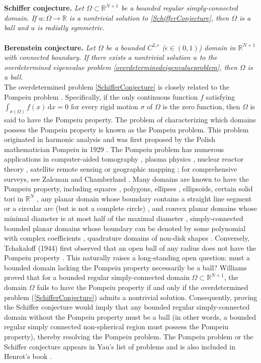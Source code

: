 \documentclass[12pt]{article}
\numberwithin{equation}{section}
\numberwithin{equation}{section}
\begin{document}
\\ \\
\textbf{Schiffer conjecture.} \emph{Let $\Omega\subset \mathbb{R}^{N+1}$ be a bounded regular simply-connected domain. If $u: \Omega \rightarrow \mathbb{R}$
is a nontrivial solution to \eqref{SchifferConjecture},
then $\Omega$ is a ball and $u$ is radially symmetric.}\\
\\
\textbf{Berenstein conjecture.}
\emph{Let $\Omega$ be a bounded $C^{2,\epsilon}$ ($\epsilon\in(0,1)$) domain in $\mathbb{R}^{N+1}$ with connected boundary. If there exists a nontrivial
solution $u$ to the overdetermined eigenvalue problem \eqref{overdeterminedeigenvalueproblem}, then $\Omega$ is a ball.}\\

The overdetermined problem \eqref{SchifferConjecture} is closely related to the Pompeiu problem \cite{Pompeiu}. Specifically, if the only continuous function $f$ satisfying $\int_{\sigma(\Omega)}f(x)\,\text{d}x=0$ for every rigid motion $\sigma$ of $\Omega$ is the zero function, then $\Omega$ is said to have the Pompeiu property. The problem of characterizing which domains possess the Pompeiu property is known as the Pompeiu problem. This problem originated in harmonic analysis and was first proposed by the Polish mathematician Pompeiu in 1929 \cite{Pompeiu1}. The Pompeiu problem has numerous applications in computer-aided tomography \cite{Shepp}, plasma physics \cite{Temam}, nuclear reactor theory \cite{Berenstein, Deans}, satellite remote sensing or geographic mapping \cite{Smith,  Willms}; for comprehensive surveys, see Zalcman \cite{Zalcman} and Chamberland \cite{Chamberland}.
Many domains are known to have the Pompeiu property, including squares \cite{Christov, Pompeiu}, polygons, ellipses \cite{BST}, ellipsoids, certain solid tori in
$\mathbb{R}^N$ \cite{Dalmasso}, any planar domain whose boundary contains a straight line segment or a circular arc (but is not a complete circle) \cite{Williams0}, and convex planar domains whose minimal diameter is at most half of the maximal diameter \cite{BK}, simply-connected bounded planar domains whose boundary can be denoted by some polynomial
with complex coefficients \cite{Garofalo}, quadrature domains of non-disk shapes \cite{Ebenfelt}. Conversely, Tchakaloff (1944) first observed that an open ball of any radius does not have the Pompeiu property \cite{Tchakaloff}. This naturally raises a long-standing open question: must a bounded domain lacking the Pompeiu property necessarily be a ball?
Williams \cite[Theorem 1]{Williams1} proved that for a bounded regular simply-connected domain $\Omega\subset \mathbb{R}^{N+1}$, the domain $\Omega$ fails to have the Pompeiu property if and only if the overdetermined problem (\ref{SchifferConjecture}) admits a nontrivial solution. Consequently, proving the Schiffer conjecture would imply that any bounded regular simply-connected domain without the Pompeiu property must be a ball (in other words, a bounded regular simply connected non-spherical region must possess the Pompeiu property), thereby resolving the Pompeiu problem. The Pompeiu problem or the Schiffer conjecture appears in Yau's list of problems \cite[Problem 80]{Yau} and is also included in Henrot's book \cite[Conjecture 6.57]{Henrot}.
\end{document}
